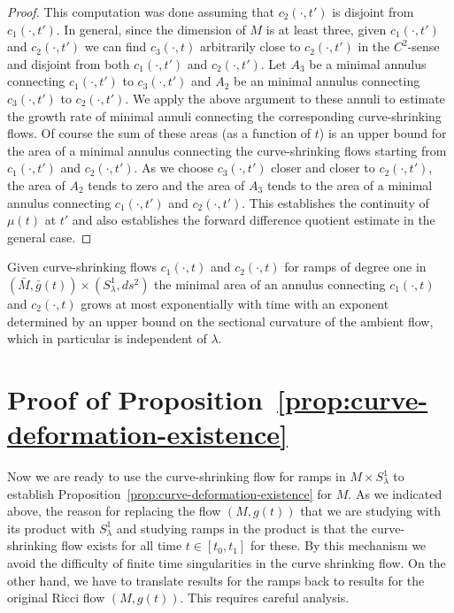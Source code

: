 \begin{proof}
This computation was done assuming that $c_2(\cdot,t')$ is disjoint
from $c_1(\cdot,t')$. In general, since the dimension of $ M$ is at
least three, given $c_1(\cdot,t')$ and $c_2(\cdot,t')$ we can find
$c_3(\cdot,t)$ arbitrarily close to $c_2(\cdot,t')$ in the
$C^2$-sense and disjoint from both $c_1(\cdot,t')$ and
$c_2(\cdot,t')$. Let $A_3$ be a minimal annulus connecting
$c_1(\cdot,t')$ to $c_3(\cdot,t')$ and $A_2$ be an minimal annulus
connecting $c_3(\cdot,t')$ to $c_2(\cdot,t')$. We apply the above
argument to these annuli to estimate the growth rate of minimal
annuli connecting the corresponding curve-shrinking flows. Of course
the sum of these areas (as a function of $t$) is an upper bound for
the area of a minimal annulus connecting the curve-shrinking flows
starting from $c_1(\cdot,t')$ and $c_2(\cdot,t')$. As we choose
$c_3(\cdot,t')$ closer and closer to $c_2(\cdot,t')$, the area of
$A_2$ tends to zero and the area of $A_3$ tends to the area of a
minimal annulus connecting $c_1(\cdot,t')$ and $c_2(\cdot,t')$. This
establishes the continuity of $\mu(t)$ at $t'$ and also establishes
the forward difference quotient estimate in the general case.
\end{proof}

\begin{corollary}
\label{cor:minimal-annulus-exponential-growth}
Given  curve-shrinking flows $c_1(\cdot,t)$ and $c_2(\cdot,t)$ for
ramps of degree one in $(\bar M,\bar g(t))\times (S^1_\lambda,ds^2)$
the minimal area of an annulus connecting $c_1(\cdot,t)$ and
$c_2(\cdot,t)$ grows at most exponentially with time with an
exponent determined by an upper bound on the sectional curvature of
the ambient flow, which in particular is independent of $\lambda$.
\end{corollary}



\section{Proof of Proposition~{\ref{prop:curve-deformation-existence}}}

Now we are ready to use the curve-shrinking flow for ramps in
$M\times S_\lambda^1$ to establish Proposition~\ref{prop:curve-deformation-existence} for $M$. As
we indicated above, the reason for replacing the flow $(M,g(t))$
that we are studying with its product with $S^1_\lambda$ and
studying ramps in the product is that the curve-shrinking flow
exists for all time $t\in [t_0,t_1]$ for these. By this mechanism we
avoid the difficulty of finite time singularities in the curve
shrinking flow. On the other hand, we have to translate results for
the ramps back to results for the original Ricci flow $(M,g(t))$.
This requires careful analysis.


